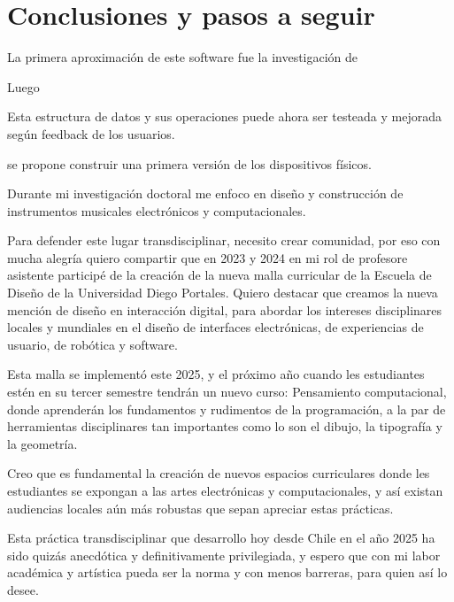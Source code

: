 \documentclass{article}
\begin{document}
\section{Conclusiones y pasos a seguir}


La primera aproximación de este software fue la investigación de

Luego

Esta estructura de datos y sus operaciones puede ahora ser testeada y mejorada según feedback de los usuarios.

se propone construir una primera versión de los dispositivos físicos.

Durante mi investigación doctoral me enfoco en diseño y construcción de instrumentos musicales electrónicos y computacionales.

Para defender este lugar transdisciplinar, necesito crear comunidad, por eso con mucha alegría quiero compartir que en 2023 y 2024 en mi rol de profesore asistente participé de la creación de la nueva malla curricular de la Escuela de Diseño de la Universidad Diego Portales. Quiero destacar que creamos la nueva mención de diseño en interacción digital, para abordar los intereses disciplinares locales y mundiales en el diseño de interfaces electrónicas, de experiencias de usuario, de robótica y software.

Esta malla se implementó este 2025, y el próximo año cuando les estudiantes estén en su tercer semestre tendrán un nuevo curso: Pensamiento computacional, donde aprenderán los fundamentos y rudimentos de la programación, a la par de herramientas disciplinares tan importantes como lo son el dibujo, la tipografía y la geometría.

Creo que es fundamental la creación de nuevos espacios curriculares donde les estudiantes se expongan a las artes electrónicas y computacionales, y así existan audiencias locales aún más robustas que sepan apreciar estas prácticas.

Esta práctica transdisciplinar que desarrollo hoy desde Chile en el año 2025 ha sido quizás anecdótica y definitivamente privilegiada, y espero que con mi labor académica y artística pueda ser la norma y con menos barreras, para quien así lo desee.

\clearpage

\printbibliography[title={Bibliografía}, heading=bibintoc]
\end{document}
